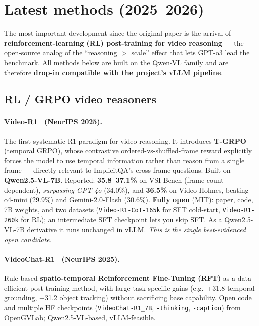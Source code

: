 \documentclass[11pt]{article}
\newcommand{\best}[1]{\textbf{#1}}
\begin{document}
\section{Latest methods (2025--2026)}
The most important development since the original paper is the arrival of
\textbf{reinforcement-learning (RL) post-training for video reasoning} --- the
open-source analog of the ``reasoning $>$ scale'' effect that lets GPT-o3 lead the
benchmark. All methods below are built on the Qwen-VL family and are therefore
\textbf{drop-in compatible with the project's vLLM pipeline}.

\subsection{RL / GRPO video reasoners}
\paragraph{Video-R1~\cite{videor1} (NeurIPS 2025).} The first systematic R1
paradigm for video reasoning. It introduces \textbf{T-GRPO} (temporal GRPO), whose
contrastive ordered-vs-shuffled-frame reward explicitly forces the model to use
temporal information rather than reason from a single frame --- directly relevant
to ImplicitQA's cross-frame questions. Built on \textbf{Qwen2.5-VL-7B}. Reported:
\best{35.8--37.1\%} on VSI-Bench (frame-count dependent), \emph{surpassing GPT-4o}
(34.0\%), and \best{36.5\%} on Video-Holmes, beating o4-mini (29.9\%) and
Gemini-2.0-Flash (30.6\%). \best{Fully open} (MIT): paper, code, 7B weights, and
two datasets (\texttt{Video-R1-CoT-165k} for SFT cold-start,
\texttt{Video-R1-260k} for RL); an intermediate SFT checkpoint lets you skip SFT.
As a Qwen2.5-VL-7B derivative it runs unchanged in vLLM. \emph{This is the single
best-evidenced open candidate.}

\paragraph{VideoChat-R1~\cite{videochatr1} (NeurIPS 2025).} Rule-based
\textbf{spatio-temporal Reinforcement Fine-Tuning (RFT)} as a data-efficient
post-training method, with large task-specific gains (e.g.\ +31.8 temporal
grounding, +31.2 object tracking) without sacrificing base capability. Open code
and multiple HF checkpoints (\texttt{VideoChat-R1\_7B}, \texttt{-thinking},
\texttt{-caption}) from OpenGVLab; Qwen2.5-VL-based, vLLM-feasible.
\end{document}
